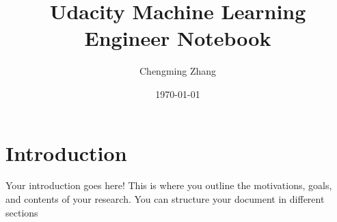 \documentclass{book}
\title{Udacity Machine Learning Engineer Notebook}
\author{Chengming Zhang}
\date{\today}
\begin{document}
\maketitle


\tableofcontents{}

\chapter{Introduction}

Your introduction goes here! This is where you outline the motivations, goals, and contents of your research. You can structure your document in different sections
\end{document}
